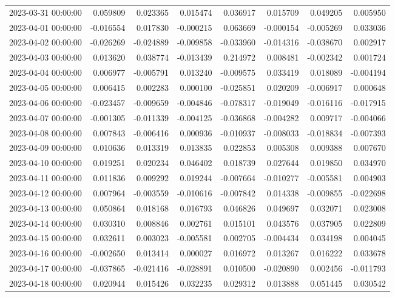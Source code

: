 \begin{tabular}{lrrrrrrr}
2023-03-31 00:00:00 & 0.059809 & 0.023365 & 0.015474 & 0.036917 & 0.015709 & 0.049205 & 0.005950 \\
2023-04-01 00:00:00 & -0.016554 & 0.017830 & -0.000215 & 0.063669 & -0.000154 & -0.005269 & 0.033036 \\
2023-04-02 00:00:00 & -0.026269 & -0.024889 & -0.009858 & -0.033960 & -0.014316 & -0.038670 & 0.002917 \\
2023-04-03 00:00:00 & 0.013620 & 0.038774 & -0.013439 & 0.214972 & 0.008481 & -0.002342 & 0.001724 \\
2023-04-04 00:00:00 & 0.006977 & -0.005791 & 0.013240 & -0.009575 & 0.033419 & 0.018089 & -0.004194 \\
2023-04-05 00:00:00 & 0.006415 & 0.002283 & 0.000100 & -0.025851 & 0.020209 & -0.006917 & 0.000648 \\
2023-04-06 00:00:00 & -0.023457 & -0.009659 & -0.004846 & -0.078317 & -0.019049 & -0.016116 & -0.017915 \\
2023-04-07 00:00:00 & -0.001305 & -0.011339 & -0.004125 & -0.036868 & -0.004282 & 0.009717 & -0.004066 \\
2023-04-08 00:00:00 & 0.007843 & -0.006416 & 0.000936 & -0.010937 & -0.008033 & -0.018834 & -0.007393 \\
2023-04-09 00:00:00 & 0.010636 & 0.013319 & 0.013835 & 0.022853 & 0.005308 & 0.009388 & 0.007670 \\
2023-04-10 00:00:00 & 0.019251 & 0.020234 & 0.046402 & 0.018739 & 0.027644 & 0.019850 & 0.034970 \\
2023-04-11 00:00:00 & 0.011836 & 0.009292 & 0.019244 & -0.007664 & -0.010277 & -0.005581 & 0.004903 \\
2023-04-12 00:00:00 & 0.007964 & -0.003559 & -0.010616 & -0.007842 & 0.014338 & -0.009855 & -0.022698 \\
2023-04-13 00:00:00 & 0.050864 & 0.018168 & 0.016793 & 0.046826 & 0.049697 & 0.032071 & 0.023008 \\
2023-04-14 00:00:00 & 0.030310 & 0.008846 & 0.002761 & 0.015101 & 0.043576 & 0.037905 & 0.022809 \\
2023-04-15 00:00:00 & 0.032611 & 0.003023 & -0.005581 & 0.002705 & -0.004434 & 0.034198 & 0.004045 \\
2023-04-16 00:00:00 & -0.002650 & 0.013414 & 0.000027 & 0.016972 & 0.013267 & 0.016222 & 0.033678 \\
2023-04-17 00:00:00 & -0.037865 & -0.021416 & -0.028891 & 0.010500 & -0.020890 & 0.002456 & -0.011793 \\
2023-04-18 00:00:00 & 0.020944 & 0.015426 & 0.032235 & 0.029312 & 0.013888 & 0.051445 & 0.030542 \\

\end{tabular}
